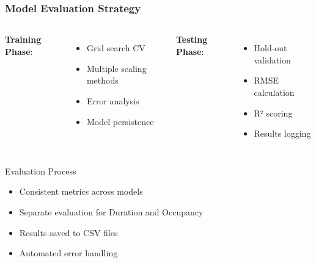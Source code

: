 \documentclass{beamer}
\begin{document}
\begin{frame}
\frametitle{Model Evaluation Strategy}
    \begin{columns}
        \textbf{Training Phase}:
            \begin{itemize}
            \item Grid search CV
            \item Multiple scaling methods
            \item Error analysis
            \item Model persistence
            \end{itemize}
            
        \textbf{Testing Phase}:
            \begin{itemize}
            \item Hold-out validation
            \item RMSE calculation
            \item R² scoring
            \item Results logging
            \end{itemize}
    \end{columns}

    \begin{alertblock}{Evaluation Process}
        \begin{itemize}
        \item Consistent metrics across models
        \item Separate evaluation for Duration and Occupancy
        \item Results saved to CSV files
        \item Automated error handling
        \end{itemize}
    \end{alertblock}
\end{frame}
\end{document}
